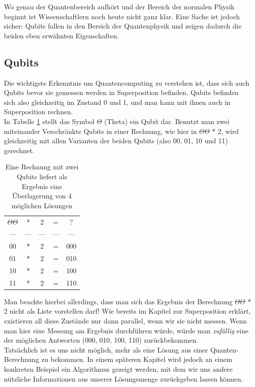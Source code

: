 \documentclass[12pt]{article}
\begin{document}
Wo genau der Quantenbereich aufhört und der Bereich der normalen Physik beginnt ist Wissenschaftlern noch heute nicht ganz klar. Eine Sache ist jedoch sicher: Qubits fallen in den Bereich der Quantenphysik und zeigen dadurch die beiden eben erwähnten Eigenschaften.

\subsection{Qubits}

Die wichtigste Erkenntnis um Quantencomputing zu verstehen ist, dass sich auch Qubits bevor sie gemessen werden in Superposition befinden. Qubits befinden sich also gleichzeitig im Zustand 0 und 1, und man kann mit ihnen auch in Superposition rechnen. \cite{mavroeidis2018impact} \\

In Tabelle \ref{tab:QubitRechnung} stellt das Symbol \(\Theta\) (Theta) ein Qubit dar. Benutzt man zwei miteinander Verschränkte Qubits in einer Rechnung, wie hier in \(\Theta\Theta\) * 2, wird gleichzeitig mit allen Varianten der beiden Qubits (also 00, 01, 10 und 11) gerechnet.

\begin{table}[h]
    \centering
    \begin{tabular}{ccccc}
        \(\Theta\Theta\) & * & 2 & = & ?\\
        --- & --- & --- & --- & --- \\
        00 & * & 2 & = & 000\\
        01 & * & 2 & = & 010\\
        10 & * & 2 & = & 100\\
        11 & * & 2 & = & 110\\
    \end{tabular}
    \caption{Eine Rechnung mit zwei Qubits liefert als Ergebnis eine Überlagerung von 4 möglichen Lösungen}
    \label{tab:QubitRechnung}
\end{table}

Man beachte hierbei allerdings, dass man sich das Ergebnis der Berechnung \(\Theta\Theta\) * 2 nicht als Liste vorstellen darf! Wie bereits im Kapitel zur Superposition erklärt, existieren all diese Zustände nur dann parallel, wenn wir sie nicht messen. Wenn man hier eine Messung am Ergebnis durchführen würde, würde man \textit{zufällig} eine der möglichen Antworten (000, 010, 100, 110) zurückbekommen. \\

Tatsächlich ist es uns nicht möglich, mehr als eine Lösung aus einer Quanten-Berechnung zu bekommen. In einem späteren Kapitel wird jedoch an einem konkreten Beispiel ein Algorithmus gezeigt werden, mit dem wir uns andere nützliche Informationen aus unserer Lösungsmenge zurückgeben lassen können.\\
\end{document}
